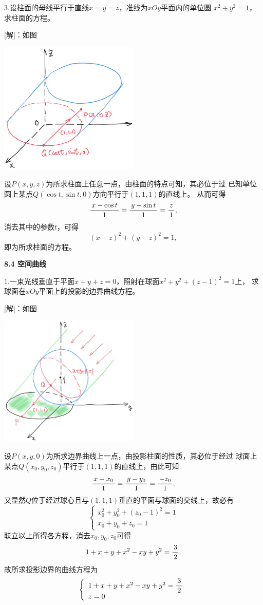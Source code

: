 \bs

3.设柱面的母线平行于直线$x=y=z$，准线为$xOy$平面内的单位圆
$x^2+y^2=1$，求柱面的方程。

[解]：如图
\begin{center}
	\includegraphics[width=0.5\textwidth]{./images/ch8/cpq.jpg}
\end{center}
设$P(x,y,z)$为所求柱面上任意一点，由柱面的特点可知，其必位于过
已知单位圆上某点$Q(\cos t,\sin t,0)$方向平行于$(1,1,1)$的直线上。
从而可得
$$\displaystyle\frac{\,{x-\cos t}\,}{\,{1}\,}=\displaystyle\frac{\,{y-\sin t}\,}{\,{1}\,}=\displaystyle\frac{\,{z}\,}{\,{1}\,},$$
消去其中的参数$t$，可得
$$(x-z)^2+(y-z)^2=1,$$
即为所求柱面的方程。\fin

\bs

\begin{center}
	\bf 8.4 空间曲线
\end{center}

1.一束光线垂直于平面$x+y+z=0$，照射在球面$x^2+y^2+(z-1)^2=1$上，
求球面在$xOy$平面上的投影的边界曲线方程。

[解]：如图
\begin{center}
	\includegraphics[width=0.5\textwidth]{./images/ch8/sunray.jpg}
\end{center}
设$P(x,y,0)$为所求边界曲线上一点，由投影柱面的性质，其必位于经过
球面上某点$Q(x_0,y_0,z_0)$平行于$(1,1,1)$的直线上，由此可知
$$\displaystyle\frac{\,{x-x_0}\,}{\,{1}\,}=\displaystyle\frac{\,{y-y_0}\,}{\,{1}\,}=\displaystyle\frac{\,{-z_0}\,}{\,{1}\,}.$$
又显然$Q$位于经过球心且与$(1,1,1)$垂直的平面与球面的交线上，故必有
$$\left\{\begin{array}{l}
	x_0^2+y_0^2+(z_0-1)^2=1\\
	x_0+y_0+z_0=1
\end{array}\right.$$
联立以上所得各方程，消去$x_0,y_0,z_0$可得
$$1+x+y+x^2-xy+y^2=\displaystyle\frac{\,{3}\,}{\,{2}\,}.$$
故所求投影边界的曲线方程为
$$\left\{\begin{array}{l}
	1+x+y+x^2-xy+y^2=\displaystyle\frac{\,{3}\,}{\,{2}\,}\\
	z=0
\end{array}\right.$$
\fin

